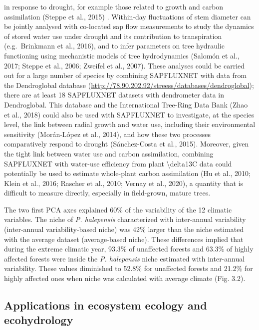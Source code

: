 \documentclass[11pt,twoside]{reedthesis}
\begin{document}
in response to drought, for example those related to growth and carbon
assimilation (Steppe et al., 2015) . Within-day fluctuations of stem
diameter can be jointly analysed with co-located sap flow measurements
to study the dynamics of stored water use under drought and its
contribution to transpiration (e.g.~Brinkmann et al., 2016), and to
infer parameters on tree hydraulic functioning using mechanistic models
of tree hydrodynamics (Salomón et al., 2017; Steppe et al., 2006;
Zweifel et al., 2007). These analyses could be carried out for a large
number of species by combining SAPFLUXNET with data from the
Dendroglobal database
(\url{http://78.90.202.92/streess/databases/dendroglobal}); there are at
least 18 SAPFLUXNET datasets with dendrometer data in Dendroglobal. This
database and the International Tree-Ring Data Bank (Zhao et al., 2018)
could also be used with SAPFLUXNET to investigate, at the species level,
the link between radial growth and water use, including their
environmental sensitivity (Morán-López et al., 2014), and how these two
processes comparatively respond to drought (Sánchez-Costa et al., 2015).
Moreover, given the tight link between water use and carbon
assimilation, combining SAPFLUXNET with water-use efficiency from plant
\textbackslash{}delta13C data could potentially be used to estimate
whole-plant carbon assimilation (Hu et al., 2010; Klein et al., 2016;
Rascher et al., 2010; Vernay et al., 2020), a quantity that is difficult
to measure directly, especially in field-grown, mature trees.\par

The two first PCA axes explained 60\% of the variability of the 12
climatic variables. The niche of \emph{P. halepensis} characterized with
inter-annual variability (inter-annual variability-based niche) was 42\%
larger than the niche estimated with the average dataset (average-based
niche). These differences implied that during the extreme climatic year,
93.3\% of unaffected forests and 63.3\% of highly affected forests were
inside the \emph{P. halepensis} niche estimated with inter-annual
variability. These values diminished to 52.8\% for unaffected forests
and 21.2\% for highly affected ones when niche was calculated with
average climate (Fig. 3.2).\par

\subsection{Applications in ecosystem ecology and
ecohydrology}\label{applications-in-ecosystem-ecology-and-ecohydrology}
\end{document}
